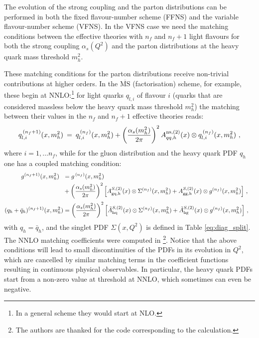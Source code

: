 \documentclass[12pt]{article}
\newcommand{\lp}{\left(}
\newcommand{\rp}{\right)}
\newcommand{\aq}{\alpha_s\left( Q^2 \right)}
\newcommand{\nf}{n_f)}
\newcommand{\nn}{\nonumber}
\newcommand{\MSbar}{\overline{\mathrm{MS}}}
\begin{document}
The evolution of the strong coupling and the parton distributions can
be performed in both the fixed flavour-number scheme (FFNS) and the 
variable flavour-number scheme (VFNS). In the VFNS case we 
need the matching conditions between the effective
theories with $n_f$ and $n_{f}+1$ light flavours for both the strong 
coupling $\aq$ and the parton distributions at the heavy quark
mass threshold $m_h^2$.

These matching conditions for the parton distributions
receive non-trivial contributions at higher orders. In the $\MSbar$
(factorisation) scheme, for example, these begin at NNLO:\footnote{In
  a general scheme they would start at NLO.} %
for light quarks $q_{l,i}$ of flavour $i$ 
(quarks that are considered massless
below the heavy quark mass threshold $m_h^2$) the matching between
their values in the $n_f$ and
$n_f+1$ effective theories reads:
\begin{equation}
\label{eq:lp-nf1}
  q_{l,i}^{\,(n_f+1)}(x,m_h^2) \: = \:  q_{l,i}^{\,(\nf}(x,m_h^2) +
\lp \frac{\alpha_s(m_h^2)}{2\pi} \rp^2
   A^{\rm ns,(2)}_{qq,h}(x) \otimes
  q_{l,i}^{\, (\nf}(x,m_h^2) \ ,
\end{equation}
where  $i = 1,\ldots n_f$, while for the gluon
distribution and the heavy quark PDF $q_h$ one has a coupled matching 
condition:
\begin{align}
\label{eq:hp-nf1}
  g^{(n_f+1)}(x,m_h^2) \:\:\: &=
    g^{\, (\nf}(x,m_h^2) 
\\ &+ \lp \frac{\alpha_s(m_h^2)}{2\pi} \rp^2 \Big[
    A_{\rm gq,h}^{S,(2)}(x) \otimes \Sigma^{(\nf}(x,m_h^2) +
    A_{\rm gg,h}^{S,(2)}(x) \otimes g^{(\nf}(x,m_h^2) \Big ]\ ,
  \nn \\[0.5mm] 
  (q_h+\bar{q}_{h})^{(n_f+1)}(x,m_h^2)  &=
   \lp \frac{\alpha_s(m_h^2)}{2\pi} \rp^2 \Big [
    \tilde{A}_{\rm hq}^{S,(2)}(x)\otimes \Sigma^{(\nf}(x,m_h^2) 
    + \tilde{A}_{\rm hg}^{S,(2)}(x)\otimes g^{(\nf}(x,m_h^2) \Big  ] \ ,
  \quad \nonumber
\end{align}
with $q_h=\bar{q}_h$, and the singlet PDF $\Sigma(x,Q^2)$ is defined
in Table \ref{eq:diag_split}.
The NNLO matching coefficients were
computed in \cite{NNLO-MTM}\footnote{The authors are thanked 
for the code corresponding to the
calculation.}.
Notice that the above conditions will lead to small discontinuities
of the PDFs in its evolution in $Q^2$, 
which are cancelled by similar matching terms
in the coefficient functions resulting in continuous physical
observables. In particular, the heavy quark PDFs start from a non-zero
value at threshold at NNLO, which sometimes can even be
negative.
\end{document}

